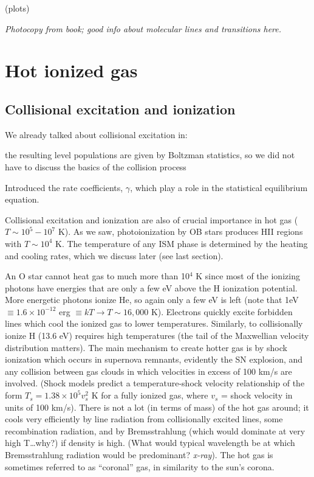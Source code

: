 \documentclass[11pt]{article}
\newcommand{\mar}[1]{\hspace{0pt}\marginpar{-\textcolor{black}{#1}-}}
\newcommand{\mynotes}[1]{{\fontfamily{cmss}\selectfont \textit{#1}}}
\begin{document}
\mar{133}\mar{134}(plots)

\mar{135}\mar{136}\mar{137}\mar{138}\mar{139}\mar{140}
\mynotes{Photocopy from book; good info about molecular lines and
transitions here.}

\newpage
\section{Hot ionized gas}
\subsection{Collisional excitation and ionization}
\mar{142}We already talked about collisional excitation in:
\begin{description}[labelwidth=5em, leftmargin=8em]
    \item [HI] the resulting level populations are given by Boltzman
        statistics, so we did not have to discuss the basics of the
        collision process
    \item [HII regions] Introduced the rate coefficients, $\gamma$,
        which play a role in the statistical equilibrium equation.
\end{description}
Collisional excitation and ionization are also of crucial importance in hot
gas ($T \sim 10^{5} - 10^{7}$ K). As we saw, photoionization by OB stars
produces HII regions with $T \sim 10^{4}$ K. The temperature of any ISM
phase is determined by the heating and cooling rates, which we discuss
later (see last section).

An O star cannot heat gas to much more than 10$^{4}$ K since most of the
ionizing photons have energies that are only a few eV above the H ionization
potential. More energetic photons ionize He, so again only a few eV is left
(note that 1eV
$\equiv 1.6 \times 10^{-12}$ erg $\equiv kT \rightarrow T \sim 16,000$ K).
Electrons quickly excite forbidden lines which cool the ionized gas to
lower temperatures. Similarly, to collisionally ionize H (13.6 eV) requires
high temperatures (the tail of the Maxwellian velocity distribution
matters). The main mechanism to create hotter gas is by shock ionization
which occurs in supernova remnants, evidently the SN explosion, and any
collision between gas clouds in which velocities \mar{143}in excess of 100
km/s are involved. (Shock models predict a temperature-shock velocity
relationship of the form $T_{s} = 1.38 \times 10^{5} v_{s}^{2}$ K for a
fully ionized gas, where $v_{s}$ = shock velocity in units of 100 km/s).
There is not a lot (in terms of mass) of the hot gas around; it cools very
efficiently by line radiation from collisionally excited lines, some
recombination radiation, and by Bremsstrahlung (which would dominate at
very high T\ldots why?) if density is high.
(What would typical wavelength be at which Bremsstrahlung radiation would
be predominant? \mynotes{x-ray}).
The hot gas is sometimes
referred to as ``coronal'' gas, in similarity to the sun's corona.
\end{document}
